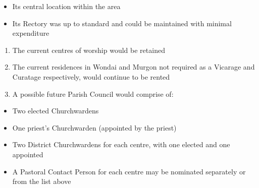 \begin{itemize}

\item

  Its central location within the area

\item

  Its Rectory was up to standard and could be maintained with minimal expenditure

\end{itemize}



\begin{enumerate}

\def\labelenumi{\arabic{enumi}.}

\setcounter{enumi}{2}

\item

  The current centres of worship would be retained

\item

  The current residences in Wondai and Murgon not required as a Vicarage and Curatage respectively, would continue to be rented

\item

  A possible future Parish Council would comprise of:

\end{enumerate}



\begin{itemize}

\item

  Two elected Churchwardens

\item

  One priest's Churchwarden (appointed by the priest)

\item

  Two District Churchwardens for each centre, with one elected and one appointed

\item

  A Pastoral Contact Person for each centre may be nominated separately or from the list above

\end{itemize}



